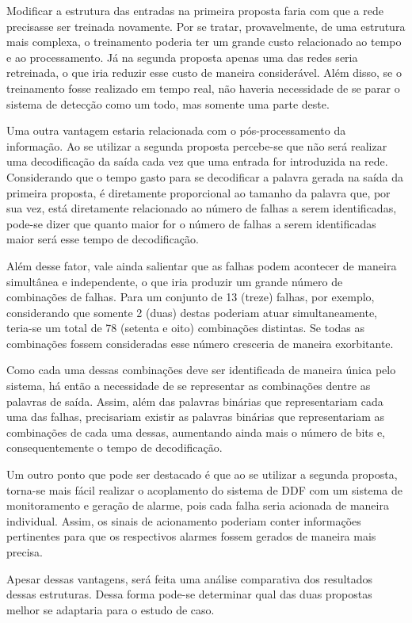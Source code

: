 Modificar a estrutura das entradas na primeira proposta faria com que a rede
precisasse ser treinada novamente. Por se tratar, provavelmente, de uma
estrutura mais complexa, o treinamento poderia ter um grande custo relacionado
ao tempo e ao processamento. Já na segunda proposta apenas uma das redes seria
retreinada, o que iria reduzir esse custo de maneira considerável. Além disso,
se o treinamento fosse realizado em tempo real, não haveria necessidade de se
parar o sistema de detecção como um todo, mas somente uma parte deste. 

Uma outra vantagem estaria relacionada com o pós-processamento da informação. Ao
se utilizar a segunda proposta percebe-se que não será realizar uma
decodificação da saída cada vez que uma entrada for introduzida na rede.
Considerando que o tempo gasto para se decodificar a palavra gerada na saída da
primeira proposta, é diretamente proporcional ao tamanho da palavra que, por sua
vez, está diretamente relacionado ao número de falhas a serem identificadas,
pode-se dizer que quanto maior for o número de falhas a serem identificadas
maior será esse tempo de decodificação.

Além desse fator, vale ainda salientar que as falhas podem acontecer de maneira
simultânea e independente, o que iria produzir um grande número de combinações
de falhas. Para um conjunto de 13 (treze) falhas, por exemplo, considerando que
somente 2 (duas) destas poderiam atuar simultaneamente, teria-se um total de 78
(setenta e oito) combinações distintas. Se todas as combinações fossem
consideradas esse número cresceria de maneira exorbitante.

Como cada uma dessas combinações deve ser identificada de maneira única pelo
sistema, há então a necessidade de se representar as combinações dentre as
palavras de saída. Assim, além das palavras binárias que representariam cada uma
das falhas, precisariam existir as palavras binárias que representariam as
combinações de cada uma dessas, aumentando ainda mais o número de bits e,
consequentemente o tempo de decodificação.

Um outro ponto que pode ser destacado é que ao se utilizar a segunda proposta,
torna-se mais fácil realizar o acoplamento do sistema de DDF com um sistema de
monitoramento e geração de alarme, pois cada falha seria acionada de maneira
individual. Assim, os sinais de acionamento poderiam conter informações
pertinentes para que os respectivos alarmes fossem gerados de maneira mais
precisa.

Apesar dessas vantagens, será feita uma análise comparativa dos resultados
dessas estruturas. Dessa forma pode-se determinar qual das duas propostas melhor
se adaptaria para o estudo de caso.

